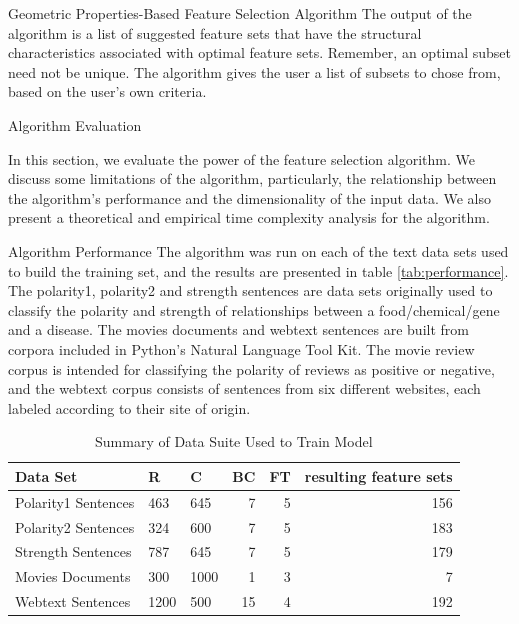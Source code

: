\documentclass{llncs}
\begin{document}
\begin{section}{Geometric Properties-Based Feature Selection Algorithm}
The output of the algorithm is a list of suggested feature sets that have the structural characteristics associated with optimal feature sets. Remember, an optimal subset need not be unique. The algorithm gives the user a list of subsets to chose from, based on the user's own criteria.

\end{section}



\begin{section}{Algorithm Evaluation}

In this section, we evaluate the power of the feature selection algorithm. We discuss some limitations of the algorithm, particularly, the relationship between the algorithm's performance and the dimensionality of the input data. We also present a theoretical and empirical time complexity analysis for the algorithm.


\begin{subsection}{Algorithm Performance}
The algorithm was run on each of the text data sets used to build the training set, and the results are presented in table \ref{tab:performance}. The polarity1, polarity2 and strength sentences are data sets originally used to classify the polarity and strength of relationships between a food/chemical/gene and a disease\cite{Yang}. The movies documents\cite{Movies} and webtext sentences\cite{nltk} are built from corpora included in Python's Natural Language Tool Kit\cite{nltk}. The movie review corpus is intended for classifying the polarity of reviews as positive or negative, and the webtext corpus consists of sentences from six different websites, each labeled according to their site of origin. 
\begin{table}[ht]
\centering
\caption{Summary of Data Suite Used to Train Model}
\begin{tabular}{l l l r r r}
\hline \hline
Data Set & R & C & BC & FT & resulting feature sets\\
\hline
Polarity1 Sentences &  463 & 645 & 7 & 5 & 156  \\
Polarity2 Sentences  &  324 & 600 & 7 & 5 & 183\\
Strength Sentences  & 787 & 645 & 7 & 5 & 179\\
Movies Documents   & 300 & 1000 & 1 & 3 & 7 \\
Webtext Sentences  & 1200 & 500 & 15 & 4 & 192\\
\hline
\end{tabular}
\label{tab:trainData}
\end{table}



\end{subsection}
\end{section}
\end{document}
